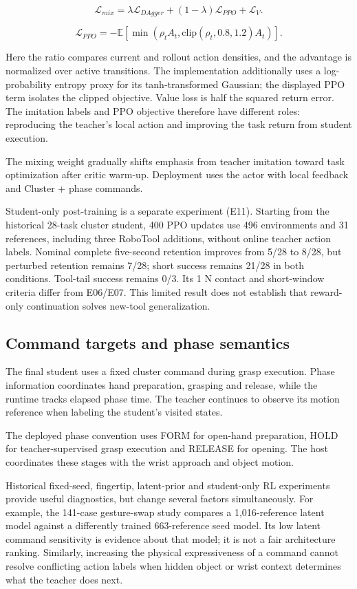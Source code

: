 \documentclass[10pt,twocolumn]{article}
\begin{document}
\[
\mathcal L_{mix}=\lambda\mathcal L_{DAgger}+(1-\lambda)\mathcal L_{PPO}+\mathcal L_V.
\]

\[
\mathcal L_{PPO}=-\mathbb E[\min(\rho_t A_t,\mathrm{clip}(\rho_t,0.8,1.2)A_t)].
\]

Here the ratio compares current and rollout action densities, and the advantage is normalized over active transitions. The implementation additionally uses a log-probability entropy proxy for its tanh-transformed Gaussian; the displayed PPO term isolates the clipped objective. Value loss is half the squared return error. The imitation labels and PPO objective therefore have different roles: reproducing the teacher's local action and improving the task return from student execution.

The mixing weight gradually shifts emphasis from teacher imitation toward task optimization after critic warm-up. Deployment uses the actor with local feedback and Cluster + phase commands.

Student-only post-training is a separate experiment (E11). Starting from the historical 28-task cluster student, 400 PPO updates use 496 environments and 31 references, including three RoboTool additions, without online teacher action labels. Nominal complete five-second retention improves from 5/28 to 8/28, but perturbed retention remains 7/28; short success remains 21/28 in both conditions. Tool-tail success remains 0/3. Its 1 N contact and short-window criteria differ from E06/E07. This limited result does not establish that reward-only continuation solves new-tool generalization.

\subsection{Command targets and phase semantics}

The final student uses a fixed cluster command during grasp execution. Phase information coordinates hand preparation, grasping and release, while the runtime tracks elapsed phase time. The teacher continues to observe its motion reference when labeling the student's visited states.

The deployed phase convention uses FORM for open-hand preparation, HOLD for teacher-supervised grasp execution and RELEASE for opening. The host coordinates these stages with the wrist approach and object motion.

Historical fixed-seed, fingertip, latent-prior and student-only RL experiments provide useful diagnostics, but change several factors simultaneously. For example, the 141-case gesture-swap study compares a 1,016-reference latent model against a differently trained 663-reference seed model. Its low latent command sensitivity is evidence about that model; it is not a fair architecture ranking. Similarly, increasing the physical expressiveness of a command cannot resolve conflicting action labels when hidden object or wrist context determines what the teacher does next.
\end{document}
